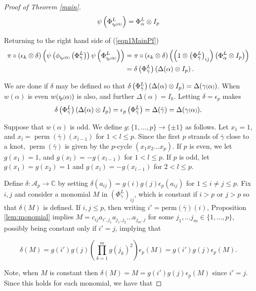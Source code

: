 \documentclass[11pt]{amsart}
\def\C{{\mathbb C}}
\def\A{{\mathcal A}}
\newcommand*{\smallp}[1]{\scalebox{.75}{\ensuremath#1}}
\newcommand*{\subsmallp}[1]{\scalebox{.5}{\ensuremath#1}}
\newcommand{\pp}[2][p]{\imath_{\hspace*{-1pt}#1}\hspace*{-.5pt}\smallp(#2\smallp)}
\newcommand{\subpp}[2][p]{\imath_{\hspace*{-1pt}#1}\hspace*{-.5pt}\subsmallp(#2\subsmallp)}
\newcommand\perm{\operatorname{perm}}
\theoremstyle{definition}
\begin{document}
\begin{proof}[Proof of Theorem \ref{main}]
$$\psi\left(\Phi_{\subpp\alpha}^L\right) = \Phi_\alpha^L \otimes I_p$$

\noindent Returning to the right hand side of (\ref{eqn1MainPf})
\begin{align*}
\pi\circ(\epsilon_k\otimes\delta)\left(\psi\left(\phi_{\subpp\alpha}\left(\Phi_{\bar\gamma}^L\right)\right)\psi\left(\Phi_{\subpp\alpha}^L\right)\right)
    & = \pi\circ(\epsilon_k\otimes\delta)\left(\left(1\otimes \left(\Phi_{\bar\gamma}^L\right)_{ij}\right)\left(\Phi_\alpha^L\otimes I_p\right)\right)\\
    & = \delta\left(\Phi_{\bar\gamma}^L\right)\left(\Delta(\alpha)\otimes I_p\right).
\end{align*}

We are done if $\delta$ may be defined so that $\delta\left(\Phi_{\bar\gamma}^L\right)\left(\Delta(\alpha)\otimes I_p\right) = \Delta(\gamma\smallp(\alpha\smallp))$.  When $w(\alpha)$ is even $w(\pp\alpha)$ is also, and further $\Delta(\alpha)=I_k$. Letting $\delta = \epsilon_p$ makes 
\begin{equation*}
\delta\left(\Phi_{\bar\gamma}^L\right)\left(\Delta(\alpha)\otimes I_p\right) = \epsilon_p\left(\Phi_{\bar\gamma}^L\right) = \Delta(\bar\gamma) = \Delta(\gamma\smallp(\alpha\smallp)).
\end{equation*}

Suppose that $w(\alpha)$ is odd. We define $g\colon \{1,\ldots,p\}\rightarrow \{\pm 1\}$ as follows. Let $x_1 = 1$, and $x_l = \perm(\bar\gamma)(x_{l-1})$ for $1<l\le p$. Since the first $p$ strands of $\bar\gamma$ close to a knot, $\perm(\bar\gamma)$ is given by the $p$-cycle $(x_1x_2\ldots x_p)$. If $p$ is even, we let $g(x_1) = 1$, and $g(x_l) = -g(x_{l-1})$ for $1<l\le p$. If $p$ is odd, let $g(x_1) = g(x_2) = 1$ and $g(x_l) = -g(x_{l-1})$ for $2<l\le p$.

 Define $\delta: \A_p\to \C$ by setting $\delta(a_{ij}) = g(i)g(j)\epsilon_p(a_{ij})$ for $1\le i\ne j\le p$. Fix $i,j$ and consider a monomial $M$ in $\left(\Phi_{\bar\gamma}^L\right)_{ij}$, which is constant if $i>p$ or $j>p$ so that $\delta(M)$ is defined. If $i,j\le p$, then writing $i'=\text{perm}(\bar\gamma)(i)$, Proposition \ref{lem:monomial} implies $M=c_{ij}a_{i',j_1}a_{j_1,j_2}\ldots a_{j_m,j}$ for some $j_1,\ldots j_m\in \{1,\ldots,p\}$, possibly being constant only if $i'=j$, implying that 

$$\delta(M) = g(i')g(j)\left(\prod_{k=1}^m g(j_k)^2\right)\epsilon_p(M) = g(i')g(j)\epsilon_p(M).$$

\noindent Note, when $M$ is constant then $\delta(M) = M = g(i')g(j)\epsilon_p(M)$ since $i'=j$. Since this holds for each monomial, we have that


\end{proof}
\end{document}
